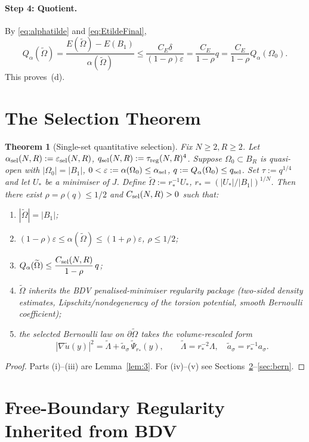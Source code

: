 \documentclass[11pt]{article}
\newtheorem{theorem}{Theorem}
\theoremstyle{definition}
\newcommand{\eps}{\varepsilon}
\newcommand{\wt}{\widetilde}
\newcommand{\Om}{\Omega}
\begin{document}
\paragraph{Step 4: Quotient.}
By \eqref{eq:alphatilde} and \eqref{eq:EtildeFinal},
\[
Q_\alpha(\wt\Om)=\frac{E(\wt\Om)-E(B_1)}{\alpha(\wt\Om)}
\le\frac{C_E\delta}{(1-\rho)\eps}=\frac{C_E}{1-\rho}q
=\frac{C_E}{1-\rho}Q_\alpha(\Om_0).
\]
This proves~(d).

\section{The Selection Theorem}\label{sec:thm}

\begin{theorem}[Single-set quantitative selection]\label{thm:main}
Fix $N\ge2,R\ge2$. Let
$\alpha_{\rm sel}(N,R):=\eps_{\rm sel}(N,R)$,
$q_{\rm sel}(N,R):=\tau_{\rm reg}(N,R)^4$. Suppose $\Om_0\subset B_R$ is
quasi-open with $|\Om_0|=|B_1|$, $0<\eps:=\alpha(\Om_0)\le\alpha_{\rm sel}$,
$q:=Q_\alpha(\Om_0)\le q_{\rm sel}$. Set $\tau:=q^{1/4}$ and let $U_*$ be a
minimiser of $J$. Define $\wt\Om:=r_*^{-1}U_*$,
$r_*=(|U_*|/|B_1|)^{1/N}$. Then there exist $\rho=\rho(q)\le1/2$ and
$C_{\rm sel}(N,R)>0$ such that:
\begin{enumerate}
\item[\rm(i)] $|\wt\Om|=|B_1|$;
\item[\rm(ii)] $(1-\rho)\eps\le\alpha(\wt\Om)\le(1+\rho)\eps$, $\rho\le1/2$;
\item[\rm(iii)] $Q_\alpha(\wt\Om)\le\dfrac{C_{\rm sel}(N,R)}{1-\rho}\,q$;
\item[\rm(iv)] $\wt\Om$ inherits the BDV penalised-minimiser regularity
package (two-sided density estimates, Lipschitz/nondegeneracy of the
torsion potential, smooth Bernoulli coefficient);
\item[\rm(v)] the selected Bernoulli law on $\partial\wt\Om$ takes the
volume-rescaled form
\[
|\nabla\wt u(y)|^2=\wt\Lambda+\wt a_\sigma\,\wt\Psi_{r_*}(y),
\qquad\wt\Lambda=r_*^{-2}\Lambda,\quad\wt a_\sigma=r_*^{-1}a_\sigma.
\]
\end{enumerate}
\end{theorem}

\begin{proof}
Parts (i)--(iii) are Lemma~\ref{lem:3}. For (iv)--(v) see
Sections~\ref{sec:reg}--\ref{sec:bern}.
\end{proof}

\section{Free-Boundary Regularity Inherited from BDV}\label{sec:reg}
\end{document}
